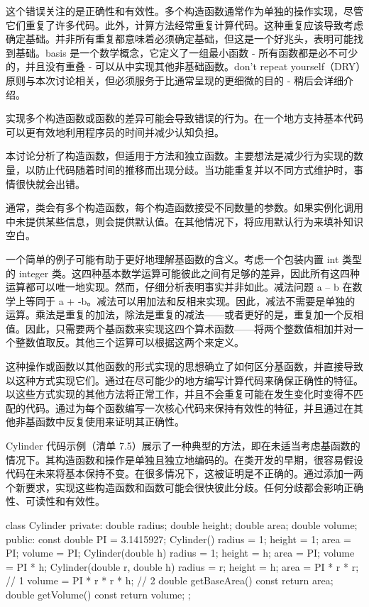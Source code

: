 这个错误关注的是正确性和有效性。多个构造函数通常作为单独的操作实现，尽管它们重复了许多代码。此外，计算方法经常重复计算代码。这种重复应该导致考虑确定基础。并非所有重复都意味着必须确定基础，但这是一个好兆头，表明可能找到基础。basis 是一个数学概念，它定义了一组最小函数 - 所有函数都是必不可少的，并且没有重叠 - 可以从中实现其他非基础函数。don’t repeat yourself（DRY）原则与本次讨论相关，但必须服务于比通常呈现的更细微的目的 - 稍后会详细介绍。

实现多个构造函数或函数的差异可能会导致错误的行为。在一个地方支持基本代码可以更有效地利用程序员的时间并减少认知负担。

本讨论分析了构造函数，但适用于方法和独立函数。主要想法是减少行为实现的数量，以防止代码随着时间的推移而出现分歧。当功能重复并以不同方式维护时，事情很快就会出错。

通常，类会有多个构造函数，每个构造函数接受不同数量的参数。如果实例化调用中未提供某些信息，则会提供默认值。在其他情况下，将应用默认行为来填补知识空白。


一个简单的例子可能有助于更好地理解基函数的含义。考虑一个包装内置 int 类型的 integer 类。这四种基本数学运算可能彼此之间有足够的差异，因此所有这四种运算都可以唯一地实现。然而，仔细分析表明事实并非如此。减法问题 a – b 在数学上等同于 a + -b。减法可以用加法和反相来实现。因此，减法不需要是单独的运算。乘法是重复的加法，除法是重复的减法——或者更好的是，重复加一个反相值。因此，只需要两个基函数来实现这四个算术函数——将两个整数值相加并对一个整数值取反。其他三个运算可以根据这两个来定义。

这种操作或函数以其他函数的形式实现的思想确立了如何区分基函数，并直接导致以这种方式实现它们。通过在尽可能少的地方编写计算代码来确保正确性的特征。以这些方式实现的其他方法将正常工作，并且不会重复可能在发生变化时变得不匹配的代码。通过为每个函数编写一次核心代码来保持有效性的特征，并且通过在其他非基函数中反复使用来证明其正确性。

Cylinder 代码示例（清单 7.5）展示了一种典型的方法，即在未适当考虑基函数的情况下。其构造函数和操作是单独且独立地编码的。在类开发的早期，很容易假设代码在未来将基本保持不变。在很多情况下，这被证明是不正确的。通过添加一两个新要求，实现这些构造函数和函数可能会很快彼此分歧。任何分歧都会影响正确性、可读性和有效性。


\begin{cpp}
class Cylinder {
private:
  double radius;
  double height;
  double area;
  double volume;
public:
  const double PI = 3.1415927;
  Cylinder() {
    radius = 1;
    height = 1;
    area = PI;
    volume = PI;
  }
  Cylinder(double h) {
    radius = 1;
    height = h;
    area = PI;
    volume = PI * h;
  }
  Cylinder(double r, double h) {
    radius = r;
    height = h;
    area = PI * r * r; // 1
    volume = PI * r * r * h; // 2
  }
  double getBaseArea() const { return area; }
  double getVolume() const { return volume; }
};
\end{cpp}

